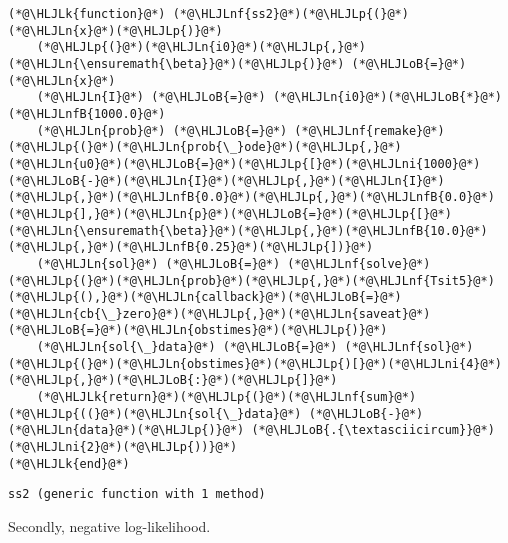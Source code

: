 \documentclass[12pt,a4paper]{article}
\newcommand{\HLJLk}[1]{\textcolor[RGB]{148,91,176}{\textbf{#1}}}
\newcommand{\HLJLn}[1]{#1}
\newcommand{\HLJLnf}[1]{\textcolor[RGB]{66,102,213}{#1}}
\newcommand{\HLJLnfB}[1]{\textcolor[RGB]{59,151,46}{#1}}
\newcommand{\HLJLni}[1]{\textcolor[RGB]{59,151,46}{#1}}
\newcommand{\HLJLoB}[1]{\textcolor[RGB]{102,102,102}{\textbf{#1}}}
\newcommand{\HLJLp}[1]{#1}
\begin{document}
\begin{lstlisting}
(*@\HLJLk{function}@*) (*@\HLJLnf{ss2}@*)(*@\HLJLp{(}@*)(*@\HLJLn{x}@*)(*@\HLJLp{)}@*)
    (*@\HLJLp{(}@*)(*@\HLJLn{i0}@*)(*@\HLJLp{,}@*)(*@\HLJLn{\ensuremath{\beta}}@*)(*@\HLJLp{)}@*) (*@\HLJLoB{=}@*) (*@\HLJLn{x}@*)
    (*@\HLJLn{I}@*) (*@\HLJLoB{=}@*) (*@\HLJLn{i0}@*)(*@\HLJLoB{*}@*)(*@\HLJLnfB{1000.0}@*)
    (*@\HLJLn{prob}@*) (*@\HLJLoB{=}@*) (*@\HLJLnf{remake}@*)(*@\HLJLp{(}@*)(*@\HLJLn{prob{\_}ode}@*)(*@\HLJLp{,}@*)(*@\HLJLn{u0}@*)(*@\HLJLoB{=}@*)(*@\HLJLp{[}@*)(*@\HLJLni{1000}@*)(*@\HLJLoB{-}@*)(*@\HLJLn{I}@*)(*@\HLJLp{,}@*)(*@\HLJLn{I}@*)(*@\HLJLp{,}@*)(*@\HLJLnfB{0.0}@*)(*@\HLJLp{,}@*)(*@\HLJLnfB{0.0}@*)(*@\HLJLp{],}@*)(*@\HLJLn{p}@*)(*@\HLJLoB{=}@*)(*@\HLJLp{[}@*)(*@\HLJLn{\ensuremath{\beta}}@*)(*@\HLJLp{,}@*)(*@\HLJLnfB{10.0}@*)(*@\HLJLp{,}@*)(*@\HLJLnfB{0.25}@*)(*@\HLJLp{])}@*)
    (*@\HLJLn{sol}@*) (*@\HLJLoB{=}@*) (*@\HLJLnf{solve}@*)(*@\HLJLp{(}@*)(*@\HLJLn{prob}@*)(*@\HLJLp{,}@*)(*@\HLJLnf{Tsit5}@*)(*@\HLJLp{(),}@*)(*@\HLJLn{callback}@*)(*@\HLJLoB{=}@*)(*@\HLJLn{cb{\_}zero}@*)(*@\HLJLp{,}@*)(*@\HLJLn{saveat}@*)(*@\HLJLoB{=}@*)(*@\HLJLn{obstimes}@*)(*@\HLJLp{)}@*)
    (*@\HLJLn{sol{\_}data}@*) (*@\HLJLoB{=}@*) (*@\HLJLnf{sol}@*)(*@\HLJLp{(}@*)(*@\HLJLn{obstimes}@*)(*@\HLJLp{)[}@*)(*@\HLJLni{4}@*)(*@\HLJLp{,}@*)(*@\HLJLoB{:}@*)(*@\HLJLp{]}@*)
    (*@\HLJLk{return}@*)(*@\HLJLp{(}@*)(*@\HLJLnf{sum}@*)(*@\HLJLp{((}@*)(*@\HLJLn{sol{\_}data}@*) (*@\HLJLoB{-}@*) (*@\HLJLn{data}@*)(*@\HLJLp{)}@*) (*@\HLJLoB{.{\textasciicircum}}@*)(*@\HLJLni{2}@*)(*@\HLJLp{))}@*)
(*@\HLJLk{end}@*)
\end{lstlisting}

\begin{lstlisting}
ss2 (generic function with 1 method)
\end{lstlisting}


Secondly, negative log-likelihood.
\end{document}
